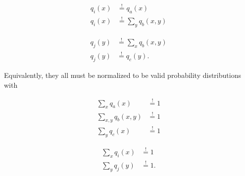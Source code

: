 \noindent
\begin{minipage}[t]{0.5\textwidth}
    \setlength{\abovedisplayskip}{0pt}
    \setlength{\belowdisplayskip}{0pt}
    \begin{align}
        q_i(x) & \overset{!}{=} q_a(x)          \\[0.8em]
        q_i(x) & \overset{!}{=} \sum_y q_b(x,y)
    \end{align}
\end{minipage}\hfill
\begin{minipage}[t]{0.5\textwidth}
    \setlength{\abovedisplayskip}{0pt}
    \setlength{\belowdisplayskip}{0pt}
    \begin{align}
        q_j(y) & \overset{!}{=} \sum_x q_b(x,y) \\
        q_j(y) & \overset{!}{=} q_c(y).
    \end{align}
\end{minipage}

\vspace{1em}
Equivalently, they all must be normalized to be valid probability distributions with

\noindent
\begin{minipage}[t]{0.5\textwidth}
    \setlength{\abovedisplayskip}{0pt}
    \setlength{\belowdisplayskip}{0pt}
    \begin{align}
        \sum_x q_a(x)       & \overset{!}{=} 1 \\[0.1em]
        \sum_{x,y} q_b(x,y) & \overset{!}{=} 1 \\
        \sum_y q_c(x)       & \overset{!}{=} 1
    \end{align}
\end{minipage}\hfill
\begin{minipage}[t]{0.5\textwidth}
    \setlength{\abovedisplayskip}{0pt}
    \setlength{\belowdisplayskip}{0pt}
    \begin{align}
        \sum_x q_i(x) & \overset{!}{=} 1  \\
        \sum_y q_j(y) & \overset{!}{=} 1.
    \end{align}
\end{minipage}

